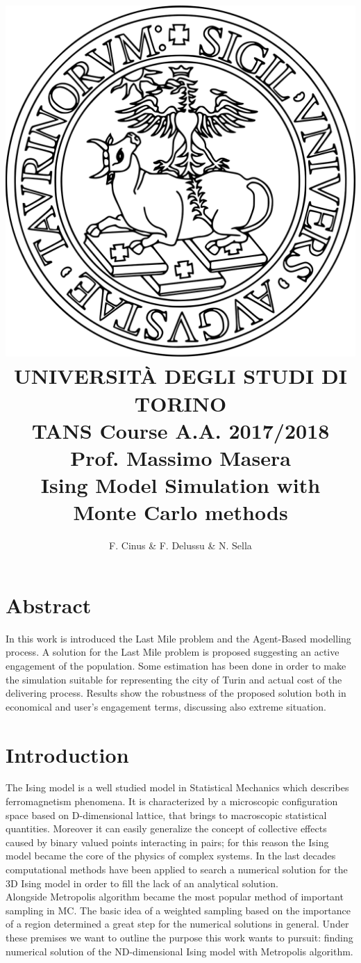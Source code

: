 \documentclass[11pt,a4paper]{article}
\author{F. Cinus \& F. Delussu \& N. Sella}
\title{\includegraphics[scale=0.12]{Unito-logo} \\ \LARGE{UNIVERSIT\`{A} DEGLI STUDI DI TORINO} 
\\
TANS Course A.A. 2017/2018 Prof. Massimo Masera
\\
 \textbf{Ising Model Simulation with Monte Carlo methods}
}
\begin{document}
\date{}
\maketitle
\bigskip
\section*{Abstract}
In this work is introduced the Last Mile problem and the Agent-Based modelling process.
A solution for the Last Mile problem is proposed suggesting an active engagement of the population.
Some estimation has been done in order to make the simulation suitable for representing the city of Turin and actual cost of the delivering process.
Results show the robustness of the proposed solution both in economical and user's engagement terms, discussing also extreme situation.

\newpage
\section*{Introduction}
The Ising model is a well studied model in Statistical Mechanics which describes ferromagnetism phenomena. It is characterized by a microscopic configuration space based on D-dimensional lattice, that brings to macroscopic statistical quantities. Moreover it can easily generalize the concept of collective effects caused by binary valued points interacting in pairs; for this reason the Ising model became the core of the physics of complex systems. In the last decades computational methods have been applied to search a numerical solution for the 3D Ising model in order to  fill the lack of an analytical solution.  
\\
Alongside Metropolis algorithm became the most popular method of important sampling in MC. The basic idea of a weighted sampling based on the importance of a region determined a great step for the numerical solutions in general. Under these premises we want to outline the purpose this work wants to pursuit: finding numerical solution of the ND-dimensional Ising model with Metropolis algorithm.
\end{document}
